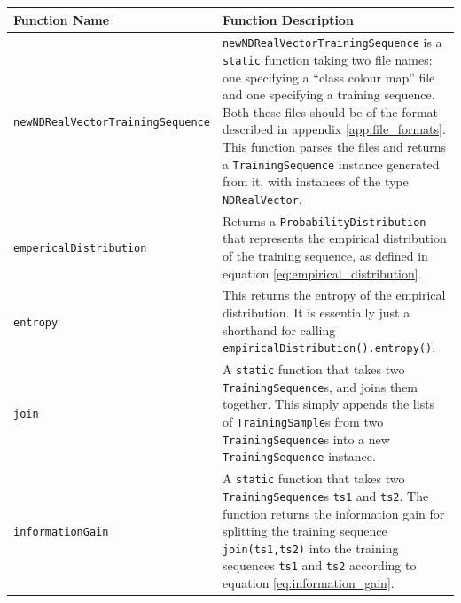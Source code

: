 \documentclass[12pt,twoside,notitlepage]{report}
\begin{document}
                \begin{table}[H]
                    \begin{tabularx}{\textwidth}{p{4.5cm}|X}
                        \textbf{Function Name} & \textbf{Function Description} \\
                        \hline

                        {\tt newNDRealVector\-TrainingSequence} & 
                            \texttt{newNDRealVectorTrainingSequence} is a \texttt{static} function taking two file names:
                            one specifying 
                            a ``class colour map'' file and one specifying a training sequence. Both these files should 
                            be of the format described in appendix \ref{app:file_formats}. This function parses the 
                            files and returns a \texttt{TrainingSequence} instance generated from it, with instances 
                            of the type \texttt{NDRealVector}. \\ 
                        \hline

                        \texttt{empericalDistribution} & 
                            Returns a \texttt{ProbabilityDistribution} that represents the empirical distribution of the 
                            training sequence, as defined in equation \ref{eq:empirical_distribution}. \\
                        \hline

                        \texttt{entropy} & 
                            This returns the entropy of the empirical distribution. It is essentially just a shorthand 
                            for calling \texttt{empiricalDistribution().entropy()}. \\
                        \hline

                        \texttt{join} & 
                            A \texttt{static} function that takes two \texttt{TrainingSequence}s, and joins them 
                            together. This simply appends the lists of \texttt{TrainingSample}s from two 
                            \texttt{TrainingSequence}s into a new \texttt{TrainingSequence} instance. \\
                        \hline

                        \texttt{informationGain} & 
                            A \texttt{static} function that takes two \texttt{TrainingSequence}s \texttt{ts1} and 
                            \texttt{ts2}. The function returns the information gain for splitting the training 
                            sequence \texttt{join(ts1,ts2)} into the training sequences \texttt{ts1} and \texttt{ts2} 
                            according to equation \ref{eq:information_gain}. \\
                        \hline


\end{tabularx}
\end{table}
\end{document}
